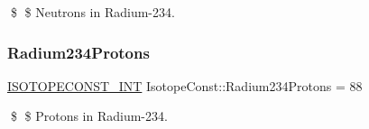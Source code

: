 \$ \$ Neutrons in Radium-\/234. \mbox{\label{group___isotope_const-_radium-_ra234_ga36a374e9ba6789132c32a9378d404331}} 
\subsubsection{\texorpdfstring{Radium234\+Protons}{Radium234Protons}}
{\footnotesize\ttfamily \mbox{\hyperlink{group___isotope_const-_macros_ga5f18360b3e99483a35c32d789e62621c}{I\+S\+O\+T\+O\+P\+E\+C\+O\+N\+S\+T\+\_\+\+I\+NT}} Isotope\+Const\+::\+Radium234\+Protons = 88}

\$ \$ Protons in Radium-\/234. 